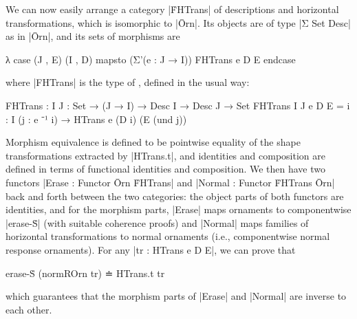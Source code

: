 We can now easily arrange a category |ḞHTrans| of descriptions and horizontal transformations, which is isomorphic to |Ōrn|.
Its objects are of type |Σ Set Desc| as in |Ōrn|, and its sets of morphisms are
\begin{code}
λ case (J , E) (I , D) mapsto (Σ'(e : J → I)) FHTrans e D E endcase
\end{code}
where |FHTrans| is the type of , defined in the usual way:
\begin{code}
FHTrans : {I J : Set} → (J → I) → Desc I → Desc J → Set
FHTrans {I} {J} e D E = {i : I} (j : e ⁻¹ i) → HTrans e (D i) (E (und j))
\end{code}
Morphism equivalence is defined to be pointwise equality of the shape transformations extracted by |HTrans.t|, and identities and composition are defined in terms of functional identities and composition.
We then have two functors |Erase : Functor Ōrn ḞHTrans| and |Normal : Functor ḞHTrans Ōrn| back and forth between the two categories: the object parts of both functors are identities, and for the morphism parts, |Erase| maps ornaments to componentwise |erase-Ṡ| (with suitable coherence proofs) and |Normal| maps families of horizontal transformations to normal ornaments (i.e., componentwise normal response ornaments).
For any |tr : HTrans e D E|, we can prove that
\begin{code}
erase-Ṡ (normROrn tr) ≐ HTrans.t tr
\end{code}
which guarantees that the morphism parts of |Erase| and |Normal| are inverse to each other.


